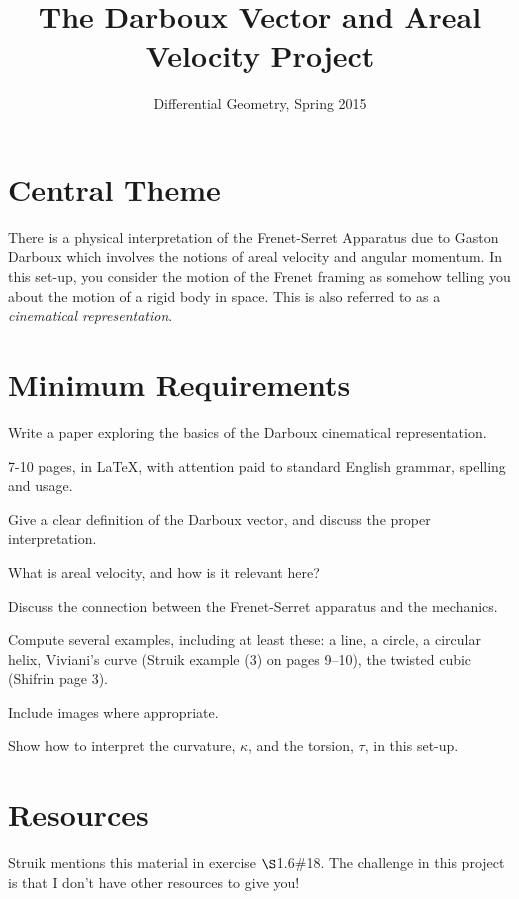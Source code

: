 \documentclass[12pt]{amsart}
\begin{document}
\title{The Darboux Vector and Areal Velocity Project}
\author{Differential Geometry, Spring 2015}

\maketitle

\section*{Central Theme}

There is a physical interpretation of the Frenet-Serret Apparatus due to Gaston Darboux which involves the notions of areal velocity and angular momentum. In this set-up, you consider the motion of the Frenet framing as somehow telling you about the motion of a rigid body in space. This is also referred to as a \emph{cinematical representation}.

\section*{Minimum Requirements}

Write a paper exploring the basics of the Darboux cinematical representation. 
\begin{compactitem}
\item 7-10 pages, in \LaTeX, with attention paid to standard English grammar, spelling and usage.
\item Give a clear definition of the Darboux vector, and discuss the proper interpretation.
\item What is areal velocity, and how is it relevant here?
\item Discuss the connection between the Frenet-Serret apparatus and the mechanics.
\item Compute several examples, including at least these: a line, a circle, a circular helix, Viviani's curve (Struik example (3) on pages 9--10), the twisted cubic (Shifrin page 3).
\item Include images where appropriate.
\item Show how to interpret the curvature, $\kappa$, and the torsion, $\tau$, in this set-up.
\end{compactitem}

\section*{Resources}

Struik mentions this material in exercise $\S$1.6\#18. The challenge in this project is that I don't have other resources to give you!
\end{document}
